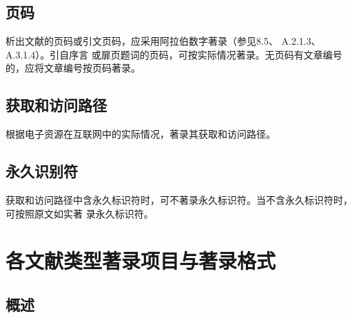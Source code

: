 \documentclass{article}
\begin{document}
\subsection{页码}
析出文献的页码或引文页码，应采用阿拉伯数字著录（参见8.5、 A.2.1.3、 A.3.1.4）。引自序言
或扉页题词的页码，可按实际情况著录。无页码有文章编号的，应将文章编号按页码著录。

\begin{refsection}
\nocite{曹凌2011-19-}
\nocite{钱学森2001--}
\nocite{冯友兰2008--}
\nocite{李约瑟1991--}
\nocite{DUBAR2013--}
\nocite{MAURYA2023}

{\printbibliography[heading=none,env=exampleenv]}
\end{refsection}


\subsection{获取和访问路径}
根据电子资源在互联网中的实际情况，著录其获取和访问路径。

\begin{refsection}

\nocite{储大同2010-721-724,weiner2010-38}

{\printbibliography[heading=none,env=exampleenv]}
\end{refsection}

\subsection{永久识别符}
获取和访问路径中含永久标识符时，可不著录永久标识符。当不含永久标识符时，可按照原文如实著
录永久标识符。

\begin{refsection}

\nocite{刘乃安2000-17-18,Deverell2013-21-22,GROSS2016LM}

{\printbibliography[heading=none,env=exampleenv]}
\end{refsection}


\section{各文献类型著录项目与著录格式}
\subsection{概述}
\end{document}
